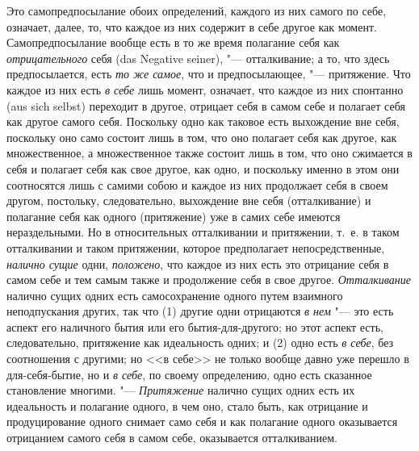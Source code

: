 Это самопредпосылание обоих определений, каждого из них самого по себе,
означает, далее, то, что каждое из них содержит в себе другое как момент.
Самопредпосылание вообще есть в то же время полагание себя как
{\em отрицательного} себя (das Negative seiner), "---
отталкивание; а то, что здесь предпосылается, есть
{\em то же самое}, что и предпосылающее, "--- притяжение.
Что каждое из них есть {\em в себе} лишь момент,
означает, что каждое из них спонтанно (aus sich selbst) переходит в
другое, отрицает себя в самом себе и полагает себя как другое самого себя.
Поскольку одно как таковое есть выхождение вне себя, поскольку оно само
состоит лишь в том, что оно полагает себя как другое, как множественное, а
множественное также состоит лишь в том, что оно сжимается в себя и полагает
себя как свое другое, как одно, и поскольку именно в этом они соотносятся
лишь с самими собою и каждое из них продолжает себя в своем другом,
постольку, следовательно, выхождение вне себя (отталкивание) и полагание
себя как одного (притяжение) уже в самих себе имеются нераздельными. Но в
относительных отталкивании и притяжении, т.~е. в таком отталкивании и таком
притяжении, которое предполагает непосредственные, {\em налично сущие} одни,
{\em положено}, что каждое из них есть это отрицание
себя в самом себе и тем самым также и продолжение себя в свое другое.
{\em Отталкивание} налично сущих одних есть
самосохранение одного путем взаимного неподпускания других, так что (1)
другие одни отрицаются {\em в нем} "--- это есть аспект
его наличного бытия или его бытия-для-другого; но этот аспект есть,
следовательно, притяжение как идеальность одних; и (2) одно есть
{\em в себе}, без соотношения с другими; но <<в себе>> не
только вообще давно уже перешло в для-себя-бытие, но и
{\em в себе}, по своему определению, одно есть
сказанное становление многими. "--- {\em Притяжение}
налично сущих одних есть их идеальность и полагание одного, в чем оно,
стало быть, как отрицание и продуцирование одного снимает само себя и как
полагание одного оказывается отрицанием самого себя в самом себе,
оказывается отталкиванием.

